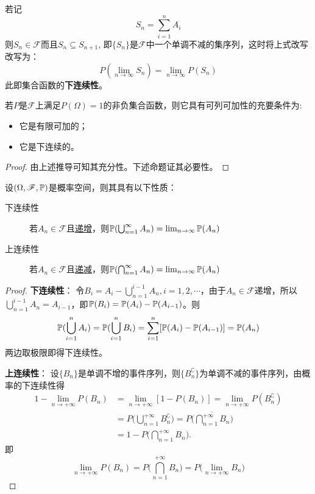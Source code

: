 若记
\[ S_n=\sum_{i=1}^n A_i \]
则$S_n \in \mathscr{F}$而且$S_n \subseteq S_{n+1}$, 即$\{ S_n \}$是$\mathscr{F}$中一个单调不减的集序列，这时将上式改写改写为：
\[ P(\lim_{n \to \infty}S_n)=\lim_{n \to \infty}P(S_n) \]
此即集合函数的\textbf{下连续性}。

\begin{theorem}[可列可加的充要条件]
    若$P$是$\mathscr{F}$上满足$P(\Omega)=1$的非负集合函数，则它具有可列可加性的充要条件为:
    \begin{itemize}
        \item 它是有限可加的；
        \item 它是下连续的。
    \end{itemize}
\end{theorem}
\begin{proof}
    由上述推导可知其充分性。下述命题证其必要性。
\end{proof}

\begin{proposition}[概率的连续性质]
    设$(\Omega,\mathscr{F},\P)$是概率空间，则其具有以下性质：
    \begin{description}
        \item[下连续性] 若$A_n \in \mathscr{F}$且\underline{递增}，则$\P(\bigcup_{n=1}^{\infty}A_{n}) =  \lim_{n\to \infty}\P(A_{n})$
        \item[上连续性] 若$A_n \in \mathscr{F}$且\underline{递减}，则$\P(\bigcap_{n=1}^{\infty}A_{n}) =  \lim_{n\to \infty}\P(A_{n})$
    \end{description}
\end{proposition}
\begin{proof}

    \textbf{下连续性}： 令$B_i=A_i-\bigcup_{n=1}^{i-1}A_{n}, i=1,2,\cdots$，由于$A_n \in \mathscr{F}$递增，所以$\bigcup_{n=1}^{i-1}A_{n}=A_{i-1}$，即$\P(B_i)=\P(A_i)-\P(A_{i-1})$。则
    \[ \P(\bigcup_{i=1}^n A_i)=\P(\bigcup_{i=1}^n B_i) = \sum_{i=1}^n [\P(A_i)-\P(A_{i-1})]=\P(A_n) \]
    两边取极限即得下连续性。

    \textbf{上连续性}： 设$\{ B_n \}$是单调不增的事件序列，则$\{ B_n^{\complement} \}$为单调不减的事件序列，由概率的下连续性得
    \begin{align*}
        1 - \lim_{n \to +\infty} P(B_n)
         & = \lim_{n \to +\infty} [1 - P(B_n)] = \lim_{n \to +\infty} P(B_n^{\complement})                                          \\
         & = P \biggl( \bigcup_{n=1}^{+\infty} B_n^{\complement} \biggr) = P \biggl( \overline{\bigcap_{n=1}^{+\infty} B_n} \biggr) \\
         & = 1 - P \biggl( \bigcap_{n=1}^{+\infty} B_n \biggr).
    \end{align*}
    即
    \[ \lim_{n \to +\infty} P(B_n) = P \biggl( \bigcap_{n=1}^{+\infty} B_n \biggr) = P \biggl(\lim_{n \to +\infty} B_n \biggr) \]
\end{proof}

